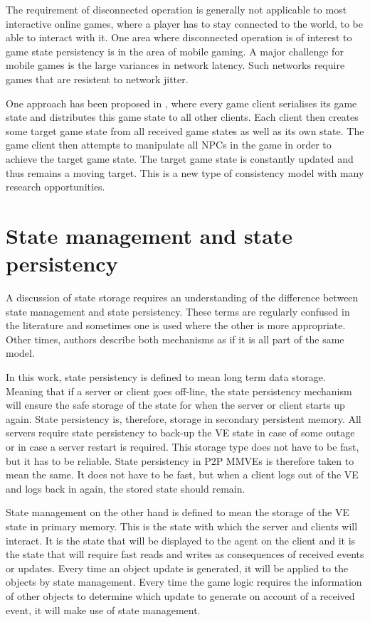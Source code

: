 The requirement of disconnected operation is generally not applicable to most interactive online games, where a player has to stay connected to the world, to be able to interact with it. One area where disconnected operation is of interest to game state persistency is in the area of mobile gaming. A major challenge for mobile games is the large variances in network latency. Such networks require games that are resistent to network jitter.

One approach has been proposed in \cite{Chandler_disconnected_games}, where every game client serialises its game state and distributes this game state to all other clients. Each client then creates some target game state from all received game states as well as its own state. The game client then attempts to manipulate all NPCs in the game in order to achieve the target game state. The target game state is constantly updated and thus remains a moving target. This is a new type of consistency model with many research opportunities.

\section{State management and state persistency}
A discussion of state storage requires an understanding of the difference between state management and state persistency. These terms are regularly confused in the literature and sometimes one is used where the other is more appropriate. Other times, authors describe both mechanisms as if it is all part of the same model.

In this work, state persistency is defined to mean long term data storage. Meaning that if a server or client goes off-line, the state persistency mechanism will ensure the safe storage of the state for when the server or client starts up again. State persistency is, therefore, storage in secondary persistent memory. All servers require state persistency to back-up the VE state in case of some outage or in case a server restart is required. This storage type does not have to be fast, but it has to be reliable. State persistency in P2P MMVEs is therefore taken to mean the same. It does not have to be fast, but when a client logs out of the VE and logs back in again, the stored state should remain.

State management on the other hand is defined to mean the storage of the VE state in primary memory. This is the state with which the server and clients will interact. It is the state that will be displayed to the agent on the client and it is the state that will require fast reads and writes as consequences of received events or updates. Every time an object update is generated, it will be applied to the objects by state management. Every time the game logic requires the information of other objects to determine which update to generate on account of a received event, it will make use of state management.

